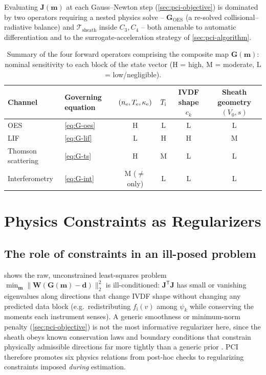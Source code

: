 Evaluating $\mathbf J(\mathbf m)$ at each Gauss--Newton step (\cref{sec:pci-objective}) is dominated by two operators requiring a nested physics solve -- $\mathbf G_{\mathrm{OES}}$ (a re-solved collisional--radiative balance) and $\mathcal T_{\mathrm{sheath}}$ inside $C_{3},C_{4}$ -- both amenable to automatic differentiation and to the surrogate-acceleration strategy of \cref{sec:pci-algorithm}.

\begin{table}[htbp]
\centering
\caption{Summary of the four forward operators comprising the composite map $\mathbf G(\mathbf m)$: nominal sensitivity to each block of the state vector (H = high, M = moderate, L = low/negligible).}
\label{tab:forward-summary}
\begin{tabularx}{\textwidth}{@{}l l c c c c@{}}
\toprule
Channel & Governing equation & $(n_{\mathrm{e}},T_{\mathrm{e}},\kappa_{\mathrm e})$ & $T_{\mathrm{i}}$ & IVDF shape $c_{k}$ & Sheath geometry $(V_{0},s)$ \\
\midrule
OES & \cref{eq:G-oes} & H & L & L & L \\
LIF & \cref{eq:G-lif} & L & H & H & M \\
Thomson scattering & \cref{eq:G-ts} & H & M & L & L \\
Interferometry & \cref{eq:G-int} & M ($\ne$ only) & L & L & L \\
\bottomrule
\end{tabularx}
\end{table}

\section{Physics Constraints as Regularizers}
\label{sec:pci-constraints}

\subsection{The role of constraints in an ill-posed problem}

 shows the raw, unconstrained least-squares problem $\min_{\mathbf m}\|\mathbf W(\mathbf G(\mathbf m)-\mathbf d)\|_{2}^{2}$ is ill-conditioned: $\mathbf J^{\mathsf T}\mathbf J$ has small or vanishing eigenvalues along directions that change IVDF shape without changing any predicted data block (e.g.\ redistributing $f_{\mathrm i}(v)$ among $\psi_{k}$ while conserving the moments each instrument senses). A generic smoothness or minimum-norm penalty (\cref{sec:pci-objective}) is not the most informative regularizer here, since the sheath obeys known conservation laws and boundary conditions that constrain physically admissible directions far more tightly than a generic prior \cite{ref0692}. PCI therefore promotes six physics relations from post-hoc checks to regularizing constraints imposed \emph{during} estimation.

